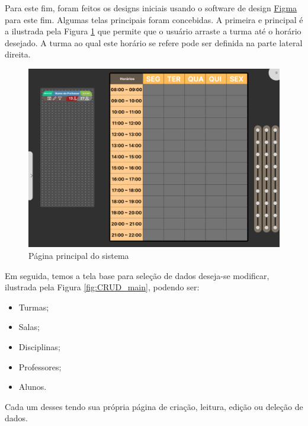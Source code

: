     Para este fim, foram feitos os designs iniciais usando o software de design \href{https://www.figma.com/}{Figma} para este fim. Algumas telas principais foram concebidas. A primeira e principal é a ilustrada pela Figura \ref{fig:main} que permite que o usuário arraste a turma até o horário desejado. A turma ao qual este horário se refere pode ser definida na parte lateral direita.

    \begin{figure}[htbp]\centering
        \caption{\label{fig:main} Página principal do sistema}
        \includegraphics[scale=0.6]{files/img/Prototipo/Medio/main.png}
    \end{figure} %

    Em seguida, temos a tela base para seleção de dados deseja-se modificar, ilustrada pela Figura \ref{fig:CRUD_main}, podendo ser:

    \begin{itemize}
        \item Turmas;
        \item Salas;
        \item Disciplinas;
        \item Professores;
        \item Alunos.
    \end{itemize}


    Cada um desses tendo sua própria página de criação, leitura, edição ou deleção de dados.

